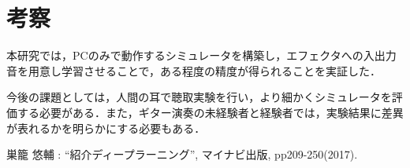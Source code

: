 \documentclass{jarticle}
\begin{document}
\section{考察}
本研究では，PCのみで動作するシミュレータを構築し，エフェクタへの入出力音を用意し学習させることで，ある程度の精度が得られることを実証した．

今後の課題としては，人間の耳で聴取実験を行い，より細かくシミュレータを評価する必要がある．また，ギター演奏の未経験者と経験者では，実験結果に差異が表れるかを明らかにする必要もある．

\begin{thebibliography}{99}%
  巣籠 悠輔 : ``紹介ディープラーニング'', マイナビ出版, pp209-250(2017).
\end{thebibliography}
\end{document}

